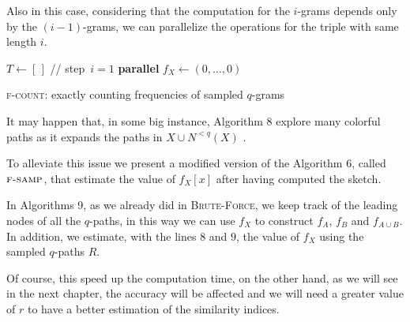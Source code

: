 Also in this case, considering that the computation for the $i$-grams depends only by the $(i-1)$-grams, we can parallelize the operations for the triple with same length $i$.

\begin{algorithm}[h]
	
	\small
	\DontPrintSemicolon
	\BlankLine
	$T\gets[\,]$ \quad // step~$i=1$\; 
	\BlankLine
	\textbf{parallel} 
	\BlankLine
	\BlankLine
	$f_X \gets (0,\ldots,0)$\;
	\BlankLine
	\BlankLine
	\caption{\textsc{f-count}: exactly counting frequencies of sampled $q$-grams}
	\label{alg:f-count}
\end{algorithm}

\clearpage

It may happen that, in some big instance, Algorithm 8 explore many colorful paths as it expands the paths in $X \cup N^{<q}(X)$ .

To alleviate this issue we present a modified version of the Algorithm 6, called $\textsc{f-samp}$, that estimate the value of $f_{X}[x]$ after having computed the sketch.\medskip

In Algorithms 9, as we already did in \textsc{Brute-Force}, we keep track of the leading nodes of all the $q$-paths, in this way we can use $f_{X}$ to construct $f_A$, $f_B$ and $f_{A \cup B}$. In addition, we estimate, with the lines $8$ and $9$, the value of $f_X$ using the sampled $q$-paths $R$.\medskip

Of course, this speed up the computation time, on the other hand, as we will see in the next chapter, the accuracy will be affected and we will need a greater value of $r$ to have a better estimation of the similarity indices.

